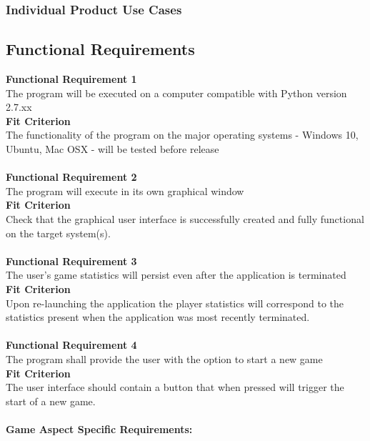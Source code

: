 \documentclass[12pt, titlepage]{article}
\newcommand {\PYVER}{2.7.xx }
\begin{document}
		\subsubsection{Individual Product Use Cases}
		\subsection{Functional Requirements}
		\indent \indent \textbf {Functional Requirement 1} \label{freq1}\\
		\indent \indent The program will be executed on a computer compatible with
		Python version \PYVER\\
		\indent \textbf {Fit Criterion}\\
		\indent \indent The functionality of the program on the major operating
		systems - Windows 10, Ubuntu, Mac OSX - will be tested before release\\\\
		\indent \textbf {Functional Requirement 2} \label{freq2}\\
		\indent \indent The program will execute in its own graphical window\\
		\indent \textbf {Fit Criterion}\\
		\indent \indent Check that the graphical user interface is successfully
		created and fully functional on the target system(s).\\\\
		\indent \textbf {Functional Requirement 3} \label{freq3}\\
		\indent \indent The user’s game statistics will persist even after the 
		application is	terminated\\
		\indent \textbf {Fit Criterion}\\
		\indent \indent Upon re-launching the application the player statistics will
		correspond to the statistics present when the application was most recently
		terminated.\\\\
		\indent \textbf {Functional Requirement 4} \label{freq4}\\
		\indent \indent The program shall provide the user with the option to start a 
		new game\\
		\indent \textbf {Fit Criterion}\\
		\indent \indent The user interface should contain a button that when pressed 
		will trigger the start of a new game.\\\\
		\indent \textbf{Game Aspect Specific Requirements:} \label{GASR}
\end{document}
